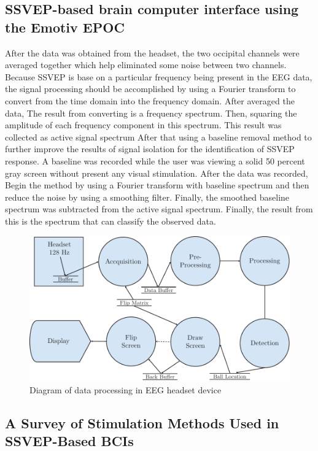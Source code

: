 \subsection {SSVEP-based brain computer interface using the Emotiv EPOC\cite{ref6}}

\hspace{1.5cm} After the data was obtained from the headset, the two occipital channels were averaged together which help eliminated some noise between two channels. Because SSVEP is base on a particular frequency being present in the EEG data, the signal processing should be accomplished by using a Fourier transform to convert from the time domain into the frequency domain. 
After averaged the data, The result from converting is a frequency spectrum. Then, squaring the amplitude of each frequency component in this spectrum. This result was collected as active signal spectrum After that using a baseline removal method to further improve the results of signal isolation for the identification of SSVEP response. A baseline was recorded while the user was viewing a solid 50 percent gray screen without present any visual stimulation. After the data was recorded, Begin the method by using a Fourier transform with baseline spectrum and then reduce the noise by using a smoothing filter. Finally, the smoothed baseline spectrum was subtracted from the active signal spectrum. Finally, the result from this is the spectrum that can classify the observed data.\\ 

\begin{figure}[ht]
	\centering
	\includegraphics[scale = 0.8]{chapter2/29.pdf}
	\caption{Diagram of data processing in EEG headset device \cite{ref6}}
\end{figure}

\subsection {A Survey of Stimulation Methods Used in SSVEP-Based BCIs\cite{ref7}}

